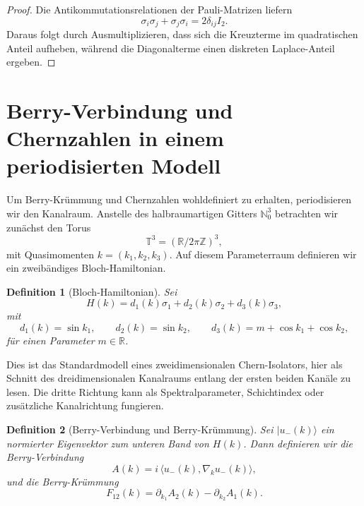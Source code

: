 \documentclass[11pt,a4paper]{article}
\newtheorem{definition}{Definition}[section]
\theoremstyle{remark}
\newcommand{\N}{\mathbb{N}}
\newcommand{\Z}{\mathbb{Z}}
\newcommand{\R}{\mathbb{R}}
\newcommand{\T}{\mathbb{T}}
\begin{document}
	\begin{proof}
		Die Antikommutationsrelationen der Pauli-Matrizen liefern
		\begin{equation}
			\sigma_i\sigma_j+\sigma_j\sigma_i=2\delta_{ij}I_2.
		\end{equation}
		Daraus folgt durch Ausmultiplizieren, dass sich die Kreuzterme im quadratischen Anteil aufheben, während die Diagonalterme einen diskreten Laplace-Anteil ergeben.
	\end{proof}
	
	\section{Berry-Verbindung und Chernzahlen in einem periodisierten Modell}
	
	Um Berry-Krümmung und Chernzahlen wohldefiniert zu erhalten, periodisieren wir den Kanalraum. Anstelle des halbraumartigen Gitters $\N_0^3$ betrachten wir zunächst den Torus
	\begin{equation}
		\T^3 = (\R/2\pi\Z)^3,
	\end{equation}
	mit Quasimomenten $k=(k_1,k_2,k_3)$. Auf diesem Parameterraum definieren wir ein zweibändiges Bloch-Hamiltonian.
	
	\begin{definition}[Bloch-Hamiltonian]
		Sei
		\begin{equation}
			H(k)= d_1(k)\sigma_1+d_2(k)\sigma_2+d_3(k)\sigma_3,
		\end{equation}
		mit
		\begin{equation}
			d_1(k)=\sin k_1,
			\qquad
			d_2(k)=\sin k_2,
			\qquad
			d_3(k)=m+\cos k_1+\cos k_2,
		\end{equation}
		für einen Parameter $m\in\R$.
	\end{definition}
	
	Dies ist das Standardmodell eines zweidimensionalen Chern-Isolators, hier als Schnitt des dreidimensionalen Kanalraums entlang der ersten beiden Kanäle zu lesen. Die dritte Richtung kann als Spektralparameter, Schichtindex oder zusätzliche Kanalrichtung fungieren.
	
	\begin{definition}[Berry-Verbindung und Berry-Krümmung]
		Sei $|u_-(k)\rangle$ ein normierter Eigenvektor zum unteren Band von $H(k)$. Dann definieren wir die Berry-Verbindung
		\begin{equation}
			A(k)= i\,\langle u_-(k),\nabla_k u_-(k)\rangle,
		\end{equation}
		und die Berry-Krümmung
		\begin{equation}
			F_{12}(k)=\partial_{k_1}A_2(k)-\partial_{k_2}A_1(k).
		\end{equation}
	\end{definition}
	
\end{document}
